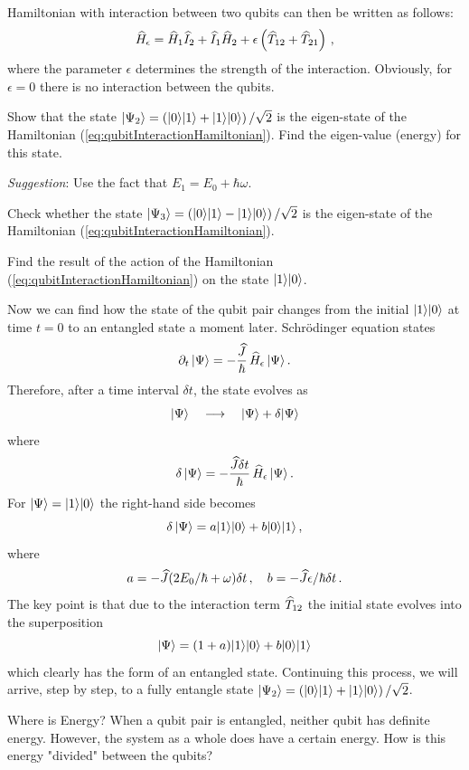 Hamiltonian with interaction between two qubits can then be written as follows:
\begin{equation}
	\widehat{H}_\epsilon=\widehat{H}_1\widehat{I}_2+\widehat{I}_1\widehat{H}_2+\epsilon\left(\widehat{T}_{12}+\widehat{T}_{21}\right)\,,
	\label{eq:qubitInteractionHamiltonian}
\end{equation}
where the parameter $\epsilon$ determines the strength of the interaction. Obviously, for $\epsilon=0$ there is no interaction between the qubits.

\begin{exercise}
	Show that the state $|{\Psi_2}\rangle = \left(|{0}\rangle|{1}\rangle + |{1}\rangle|{0}\rangle\right )/\sqrt{2}$ is the eigen-state of  the Hamiltonian (\ref{eq:qubitInteractionHamiltonian}). Find the eigen-value (energy) for this state.
	
	{\it Suggestion}: Use the fact that $E_1=E_0+\hbar\omega$. 
\end{exercise}
\begin{exercise}
	Check whether the state $|{\Psi_3}\rangle = \left(|{0}\rangle|{1}\rangle - |{1}\rangle|{0}\rangle\right )/\sqrt{2}$ is the eigen-state of the Hamiltonian (\ref{eq:qubitInteractionHamiltonian}). 
\end{exercise}
\begin{exercise}
	Find the result of the action of the Hamiltonian (\ref{eq:qubitInteractionHamiltonian}) on the state $|{1}\rangle|{0}\rangle$.
\end{exercise}
Now we can find how the state of the qubit pair changes from the initial $|{1}\rangle|{0}\rangle$ at time $t=0$ to an entangled state a moment later. Schr\"{o}dinger equation states
\[
\partial_t\,|{\Psi}\rangle=-\frac{\widehat{J}}{\hbar}\,\widehat{H}_\epsilon\,|{\Psi}\rangle\,.
\]
Therefore, after a time interval $\delta t$, the state evolves as
\[
|{\Psi}\rangle\quad\longrightarrow\quad |{\Psi}\rangle+\delta|{\Psi}\rangle
\]
where 
\[
\delta\,|{\Psi}\rangle=-\frac{\widehat{J}\delta t}{\hbar}\,\widehat{H}_\epsilon\,|{\Psi}\rangle\,.
\]
For $|{\Psi}\rangle=|{1}\rangle|{0}\rangle$ the right-hand side becomes
\[
\delta\,|{\Psi}\rangle=a|{1}\rangle|{0}\rangle+b|{0}\rangle|{1}\rangle\,,
\]
where 
\[
a = -\widehat{J}(2E_0/\hbar+\omega)\delta t\,,\quad b = -\widehat{J}\epsilon/\hbar\delta t\,.
\]
The key point is that due to the interaction term $\widehat{T}_{12}$ the initial state evolves into the superposition
\[
|{\Psi}\rangle=(1+a)|{1}\rangle|{0}\rangle+b|{0}\rangle|{1}\rangle
\]
which clearly has the form of an entangled state. Continuing this process, we will arrive, step by step, to a fully entangle state $|{\Psi_2}\rangle = \left(|{0}\rangle|{1}\rangle + |{1}\rangle|{0}\rangle\right )/\sqrt{2}$.

\begin{mybio}{Where is Energy?}
	When a qubit pair is entangled, neither qubit has definite energy. However, the system as a whole does have a certain energy. How is this energy "divided" between the qubits?
\end{mybio}




